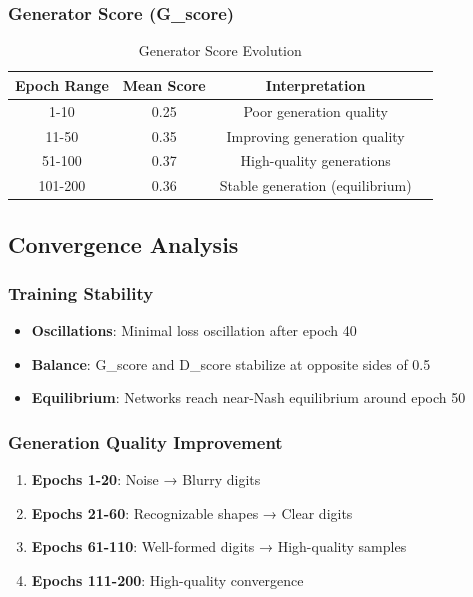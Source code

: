 \documentclass[12pt,a4paper]{article}
\begin{document}
\subsubsection{Generator Score (G\_score)}
\begin{table}[H]
    \centering
    \begin{tabular}{|c|c|c|c|}
        \hline
        \textbf{Epoch Range} & \textbf{Mean Score} & \textbf{Interpretation} \\
        \hline
        1-10 & 0.25 & Poor generation quality \\
        \hline
        11-50 & 0.35 & Improving generation quality \\
        \hline
        51-100 & 0.37 & High-quality generations \\
        \hline
        101-200 & 0.36 & Stable generation (equilibrium) \\
        \hline
    \end{tabular}
    \caption{Generator Score Evolution}
\end{table}

\subsection{Convergence Analysis}

\subsubsection{Training Stability}
\begin{itemize}
    \item \textbf{Oscillations}: Minimal loss oscillation after epoch 40
    \item \textbf{Balance}: G\_score and D\_score stabilize at opposite sides of 0.5
    \item \textbf{Equilibrium}: Networks reach near-Nash equilibrium around epoch 50
\end{itemize}

\subsubsection{Generation Quality Improvement}
\begin{enumerate}
    \item \textbf{Epochs 1-20}: Noise → Blurry digits
    \item \textbf{Epochs 21-60}: Recognizable shapes → Clear digits
    \item \textbf{Epochs 61-110}: Well-formed digits → High-quality samples
    \item \textbf{Epochs 111-200}: High-quality convergence
\end{enumerate}
\end{document}
